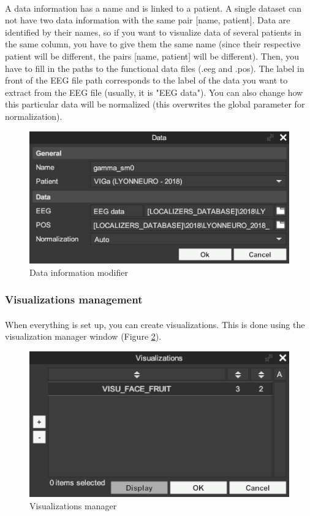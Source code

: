 \documentclass[a4paper]{article}
\begin{document}
\paragraph{} A data information has a name and is linked to a patient. A single dataset can not have two data information with the same pair [name, patient]. Data are identified by their names, so if you want to visualize data of several patients in the same column, you have to give them the same name (since their respective patient will be different, the pairs [name, patient] will be different). Then, you have to fill in the paths to the functional data files (.eeg and .pos). The label in front of the EEG file path corresponds to the label of the data you want to extract from the EEG file (usually, it is "EEG data"). You can also change how this particular data will be normalized (this overwrites the global parameter for normalization).
\begin{figure}[H]
\begin{center}
\includegraphics[scale=0.5]{DataInfoModifier.png}
\end{center}
\caption{\label{dataInfoModifierUI}Data information modifier}
\end{figure}
\subsubsection{Visualizations management}
\paragraph{} When everything is set up, you can create visualizations. This is done using the visualization manager window (Figure \ref{visuGestionUI}).
\begin{figure}[H]
\begin{center}
\includegraphics[scale=0.5]{VisualizationGestion.png}
\end{center}
\caption{\label{visuGestionUI}Visualizations manager}
\end{figure}
\end{document}
